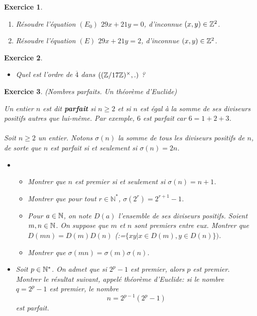 \documentclass[11pt,a4paper]{article}
\newtheorem{ex}{Exercice}
\begin{document}
\begin{ex}\label{eq_2_variables}
\begin{enumerate}
\item Résoudre l'équation $(E_0)$ $29x+21y=0$, d'inconnue $(x,y)\in \mathbb{Z}^2$.

\item Résoudre l'équation $(E)$ $29x+21y=2$, d'inconnue $(x,y)\in \mathbb{Z}^2$.
\end{enumerate}

\end{ex}


\begin{ex}\label{ordre}
\begin{itemize}
\item Quel est l'ordre de $\overline{4}$ dans $((\mathbb{Z}/17\mathbb{Z})^\times,.)$ ?


\end{itemize}
\end{ex}








\begin{ex}\label{nombres_parfaits}(Nombres parfaits. Un théorème d'Euclide)\

Un entier $n$ est dit \textbf{parfait} si $n \geqslant 2$ et si $n$ est égal à la somme de ses diviseurs positifs autres que lui-même. Par exemple, $6$ est parfait car $6=1+2+3$. \\
 \\
Soit $n\geqslant 2$ un entier. Notons $\sigma(n)$ la somme de tous les diviseurs positifs de $n$, de sorte que $n$ est parfait si et seulement si $\sigma(n)=2n$.
\begin{itemize}
\item[$1.$]\begin{itemize}
\item[$a)$] Montrer que $n$ est premier si et seulement si $\sigma(n)=n+1$.
\item[$b)$] Montrer que pour tout $r \in \mathbb{N}^*$, $\sigma(2^r)=2^{r+1}-1$.

\item[$c)$] Pour $a\in \mathbb{N}$, on note $D(a)$ l'ensemble de ses diviseurs positifs.  Soient $m,n\in \mathbb{N}$. On suppose que $m$ et $n$ sont premiers entre eux. Montrer que $D(mn)=D(m)D(n)$ (:=$\{xy|x\in D(m),y\in D(n)\})$.

\item[$d)$] Montrer que   $\sigma(mn)=\sigma(m)\sigma(n)$.
\end{itemize}
\item[$2.$] Soit $p\in \mathbb{N}^*$. On admet que  si $2^p-1$ est premier, alors $p$ est premier. Montrer le résultat suivant, appelé théorème d'Euclide: si le nombre $q=2^p-1$ est premier, le nombre
$$ n=2^{p-1}(2^p-1) $$
est parfait.
\end{itemize}
\end{ex}
\end{document}
